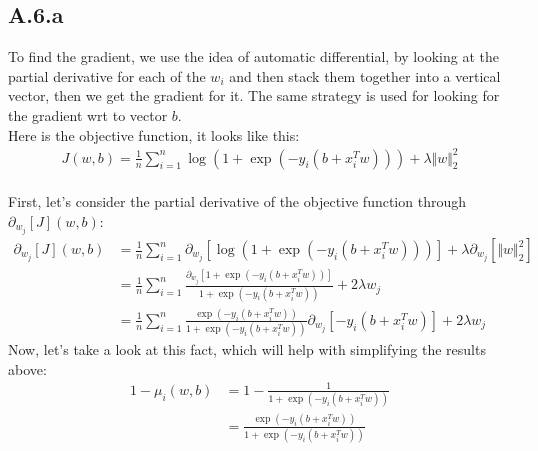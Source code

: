 \documentclass[]{article}
\begin{document}
    \subsection*{A.6.a}
        To find the gradient, we use the idea of automatic differential, by looking at the partial derivative for each of the $w_i$ and then stack them together into a vertical vector, then we get the gradient for it. The same strategy is used for looking for the gradient wrt to vector $b$. 
        \\
        Here is the objective function, it looks like this: 
        \begin{align*}\tag{A.6.a.1}\label{eqn:A.6.a.1}
            J(w, b) = \frac{1}{n}\sum_{i = 1}^{n}
                \log(1 + \exp(-y_i(b + x^T_iw))) 
                +
                \lambda \Vert w\Vert_2^2
        \end{align*}
        \\
        First, let's consider the partial derivative of the objective function through $\partial_{w_j}[J](w, b)$: 
        \begin{align*}\tag{A.6.a.2}\label{eqn:A.6.a.2}
            \partial_{w_j}[J](w, b) 
            &=
            \frac{1}{n}\sum_{i  = 1}^{n}
            \partial_{w_j}\left[
                    \log \left(
                        1 + \exp(-y_i(b + x_i^T w))
                    \right)
                \right]
            + \lambda\partial_{w_j}[\Vert w\Vert_2^2]
            \\
            &= 
            \frac{1}{n}\sum_{i  = 1}^{n}
                \frac{
                    \partial_{w_j}[1 + \exp(-y_i(b + x_i^T w))]
                }
                {
                    1 + \exp(-y_i(b + x_i^T w))
                }
                +
                2\lambda w_j
            \\
            &= 
            \frac{1}{n}\sum_{i  = 1}^{n}
                \frac{
                    \exp(-y_i(b + x_i^T w))
                }
                {
                    1 + \exp(-y_i(b + x_i^T w))
                }\partial_{w_j}[-y_i(b + x_i^Tw)]
                + 2\lambda w_j
        \end{align*}
        Now, let's take a look at this fact, which will help with simplifying the results above: 
        \begin{align*}\tag{A.6.a.3}\label{eqn:A.6.a.3}
            1 - \mu_i(w, b) &= 
            1 - \frac{1}{1 + \exp(-y_i(b+  x_i^T w))}
            \\
            &= 
            \frac{\exp(-y_i(b + x_i^T w))}{1 + \exp(-y_i(b + x_i^T w))}
        \end{align*}
\end{document}
